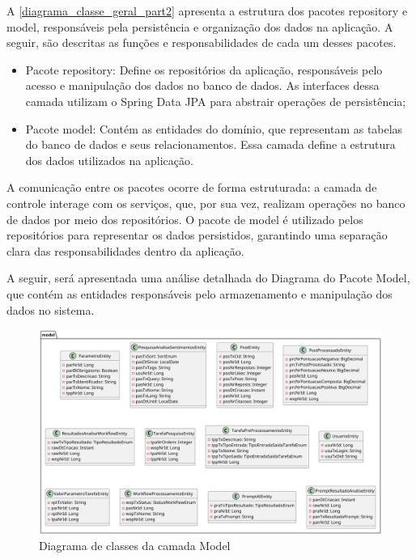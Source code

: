 \documentclass[
	12pt,				%
	oneside,			%
	a4paper,			%
	english,			%
	french,				%
	spanish,			%
	brazil				%
	]{abntex2}
\begin{document}
A \autoref{diagrama_classe_geral_part2} apresenta a estrutura dos
pacotes repository e model, responsáveis pela persistência e organização
dos dados na aplicação. A seguir, são descritas as funções e
responsabilidades de cada um desses pacotes.

\begin{itemize}
\tightlist
\item
  Pacote repository: Define os repositórios da aplicação, responsáveis
  pelo acesso e manipulação dos dados no banco de dados. As interfaces
  dessa camada utilizam o Spring Data JPA para abstrair operações de
  persistência;
\item
  Pacote model: Contém as entidades do domínio, que representam as
  tabelas do banco de dados e seus relacionamentos. Essa camada define a
  estrutura dos dados utilizados na aplicação.
\end{itemize}

A comunicação entre os pacotes ocorre de forma estruturada: a camada de
controle interage com os serviços, que, por sua vez, realizam operações
no banco de dados por meio dos repositórios. O pacote de model é
utilizado pelos repositórios para representar os dados persistidos,
garantindo uma separação clara das responsabilidades dentro da
aplicação.

A seguir, será apresentada uma análise detalhada do Diagrama do Pacote
Model, que contém as entidades responsáveis pelo armazenamento e
manipulação dos dados no sistema.

\begin{figure}[htbp]
\hypertarget{diagrama_classe_model}{%
\caption{Diagrama de classes da camada Model}\label{diagrama_classe_model}
\begin{center}
\includegraphics[scale=0.4]{imagens/sentilytics/diagramas/classes/model-classes.png}
\end{center}
}
\end{figure}
\end{document}
